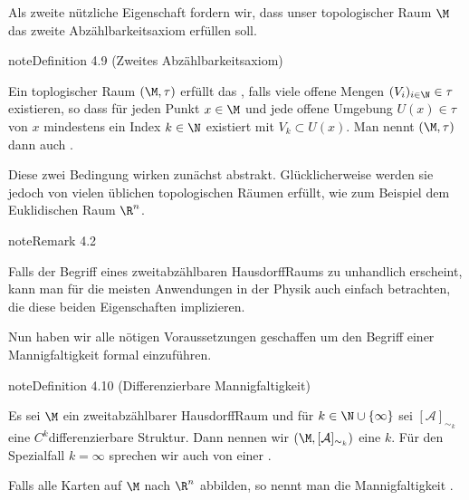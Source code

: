 \documentclass[letterpaper,10pt,english]{jupyterBook}
\begin{document}
\sphinxAtStartPar
Als zweite nützliche Eigenschaft fordern wir, dass unser topologischer Raum \(\M\) das zweite Abzählbarkeitsaxiom erfüllen soll.
\label{manifolds/manifolds_prelim:definition-11}
\begin{sphinxadmonition}{note}{Definition 4.9 (Zweites Abzählbarkeitsaxiom)}



\sphinxAtStartPar
Ein toplogischer Raum \((\M, \tau)\) erfüllt das , falls  viele offene Mengen \((V_i)_{i\in\N} \in \tau\) existieren, so dass für jeden Punkt \(x\in \M\) und jede offene Umgebung \(U(x) \in \tau\) von \(x\) mindestens ein Index \(k\in\N\) existiert mit \(V_k \subset U(x)\).
Man nennt \((\M, \tau)\) dann auch .
\end{sphinxadmonition}

\sphinxAtStartPar
Diese zwei Bedingung wirken zunächst abstrakt.
Glücklicherweise werden sie jedoch von vielen üblichen topologischen Räumen erfüllt, wie zum Beispiel dem Euklidischen Raum \(\R^n\).
\label{manifolds/manifolds_prelim:remark-12}
\begin{sphinxadmonition}{note}{Remark 4.2}



\sphinxAtStartPar
Falls der Begriff eines zweitabzählbaren Hausdorff\sphinxhyphen{}Raums zu unhandlich erscheint, kann man für die meisten Anwendungen in der Physik auch einfach  betrachten, die diese beiden Eigenschaften implizieren.
\end{sphinxadmonition}

\sphinxAtStartPar
Nun haben wir alle nötigen Voraussetzungen geschaffen um den Begriff einer Mannigfaltigkeit formal einzuführen.
\label{manifolds/manifolds_prelim:definition-13}
\begin{sphinxadmonition}{note}{Definition 4.10 (Differenzierbare Mannigfaltigkeit)}



\sphinxAtStartPar
Es sei \(\M\) ein zweitabzählbarer Hausdorff\sphinxhyphen{}Raum und für \(k\in\N\cup \{\infty\}\) sei \([\mathcal{A}]_{\sim_k}\) eine \(C^k\)\sphinxhyphen{}differenzierbare Struktur.
Dann nennen wir \((\M,[\mathcal{A}]_{\sim_k})\) eine \(k\)\sphinxhyphen{}.
Für den Spezialfall \(k=\infty\) sprechen wir auch von einer .

\sphinxAtStartPar
Falls alle Karten auf \(\M\) nach \(\R^n\) abbilden, so nennt man die Mannigfaltigkeit .
\end{sphinxadmonition}
\end{document}
